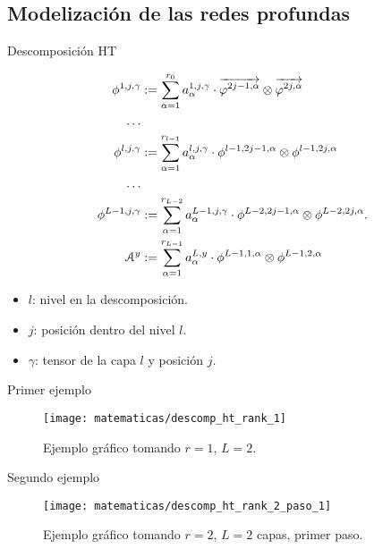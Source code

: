 \subsection{Modelización de las redes profundas}
\begin{frame}{Descomposición HT}

	\begin{equation} \label{eq:descomposicion_ht}
		\begin{split}
			\phi^{1, j, \gamma} &:= \sum_{\alpha = 1}^{r_0} a_{\alpha}^{1, j, \gamma} \cdot \overrightarrow{\varphi^{2j-1, \alpha}} \otimes \overrightarrow{\varphi^{2j, \alpha}} \\
			\ldots \\
			\phi^{l, j, \gamma} &:= \sum_{\alpha = 1}^{r_{l-1}} a_{\alpha}^{l, j, \gamma} \cdot \phi^{l-1, 2j-1, \alpha} \otimes \phi^{l-1, 2j, \alpha} \\
			\ldots \\
			\phi^{L - 1, j, \gamma} &:= \sum_{\alpha = 1}^{r_{L-2}} a_{\alpha}^{L - 1, j, \gamma} \cdot \phi^{L-2, 2j-1, \alpha} \otimes \phi^{L-2, 2j, \alpha}. \\
			\mathcal{A}^y &:= \sum_{\alpha = 1}^{r_{L-1}} a_{\alpha}^{L, y} \cdot \phi^{L-1, 1, \alpha} \otimes \phi^{L-1, 2, \alpha}
		\end{split}
	\end{equation}

	\begin{itemize}
		\item $l$: nivel en la descomposición.
		\item $j$: posición dentro del nivel $l$.
		\item $\gamma$: tensor de la capa $l$ y posición $j$.
	\end{itemize}

\end{frame}

\begin{frame}{Primer ejemplo}

	\begin{figure}
		\centering
		\texttt{[image: matematicas/descomp\_ht\_rank\_1]}
		\caption{Ejemplo gráfico tomando $r = 1$, $L = 2$.}
		\label{img:diagrama_ht_simple}
	\end{figure}

\end{frame}

\begin{frame}{Segundo ejemplo}

	\begin{figure}
		\texttt{[image: matematicas/descomp\_ht\_rank\_2\_paso\_1]}
		\caption{Ejemplo gráfico tomando $r = 2$, $L = 2$ capas, primer paso.}
	\end{figure}

\end{frame}

